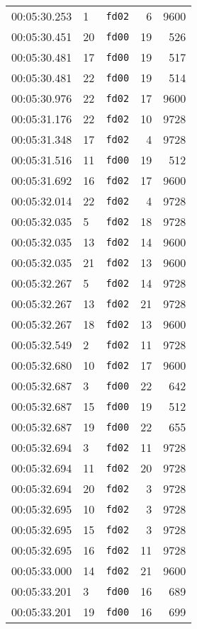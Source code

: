 \documentclass{article}
\begin{document}
\begin{longtable}{lllrr}
00:05:30.253 & 1 & \texttt{fd02} & 6 & 9600 \\
00:05:30.451 & 20 & \texttt{fd00} & 19 & 526 \\
00:05:30.481 & 17 & \texttt{fd00} & 19 & 517 \\
00:05:30.481 & 22 & \texttt{fd00} & 19 & 514 \\
00:05:30.976 & 22 & \texttt{fd02} & 17 & 9600 \\
00:05:31.176 & 22 & \texttt{fd02} & 10 & 9728 \\
00:05:31.348 & 17 & \texttt{fd02} & 4 & 9728 \\
00:05:31.516 & 11 & \texttt{fd00} & 19 & 512 \\
00:05:31.692 & 16 & \texttt{fd02} & 17 & 9600 \\
00:05:32.014 & 22 & \texttt{fd02} & 4 & 9728 \\
00:05:32.035 & 5 & \texttt{fd02} & 18 & 9728 \\
00:05:32.035 & 13 & \texttt{fd02} & 14 & 9600 \\
00:05:32.035 & 21 & \texttt{fd02} & 13 & 9600 \\
00:05:32.267 & 5 & \texttt{fd02} & 14 & 9728 \\
00:05:32.267 & 13 & \texttt{fd02} & 21 & 9728 \\
00:05:32.267 & 18 & \texttt{fd02} & 13 & 9600 \\
00:05:32.549 & 2 & \texttt{fd02} & 11 & 9728 \\
00:05:32.680 & 10 & \texttt{fd02} & 17 & 9600 \\
00:05:32.687 & 3 & \texttt{fd00} & 22 & 642 \\
00:05:32.687 & 15 & \texttt{fd00} & 19 & 512 \\
00:05:32.687 & 19 & \texttt{fd00} & 22 & 655 \\
00:05:32.694 & 3 & \texttt{fd02} & 11 & 9728 \\
00:05:32.694 & 11 & \texttt{fd02} & 20 & 9728 \\
00:05:32.694 & 20 & \texttt{fd02} & 3 & 9728 \\
00:05:32.695 & 10 & \texttt{fd02} & 3 & 9728 \\
00:05:32.695 & 15 & \texttt{fd02} & 3 & 9728 \\
00:05:32.695 & 16 & \texttt{fd02} & 11 & 9728 \\
00:05:33.000 & 14 & \texttt{fd02} & 21 & 9600 \\
00:05:33.201 & 3 & \texttt{fd00} & 16 & 689 \\
00:05:33.201 & 19 & \texttt{fd00} & 16 & 699 \\

\end{longtable}
\end{document}
